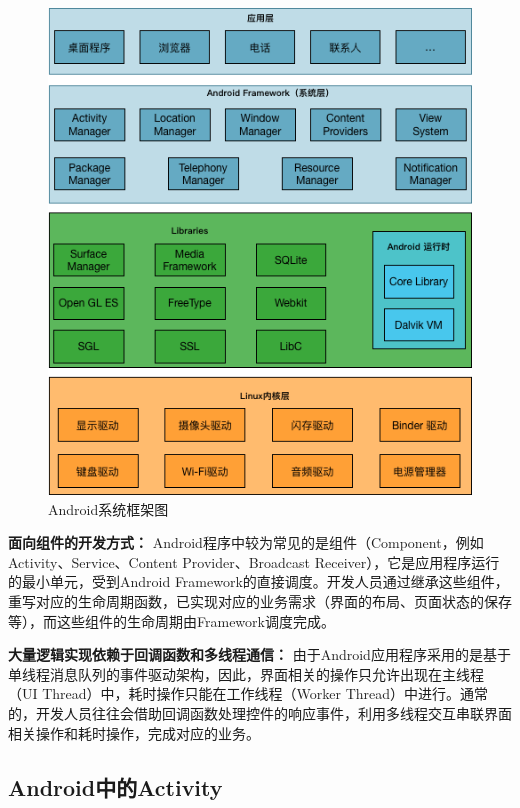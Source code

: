 \begin{figure}
	\centering
	\includegraphics[width=\textwidth]{./Figures/Android-Framework.png}
	\caption{Android系统框架图}
	\label{fig:Android-Framework}
\end{figure}

\textbf{面向组件的开发方式：}
Android程序中较为常见的是组件（Component，例如Activity、Service、Content Provider、Broadcast Receiver），它是应用程序运行的最小单元，受到Android Framework的直接调度。开发人员通过继承这些组件，重写对应的生命周期函数，已实现对应的业务需求（界面的布局、页面状态的保存等），而这些组件的生命周期由Framework调度完成。

\textbf{大量逻辑实现依赖于回调函数和多线程通信：}
由于Android应用程序采用的是基于单线程消息队列的事件驱动架构，因此，界面相关的操作只允许出现在主线程（UI Thread）中，耗时操作只能在工作线程（Worker Thread）中进行。通常的，开发人员往往会借助回调函数处理控件的响应事件，利用多线程交互串联界面相关操作和耗时操作，完成对应的业务。


\subsection{Android中的Activity}

